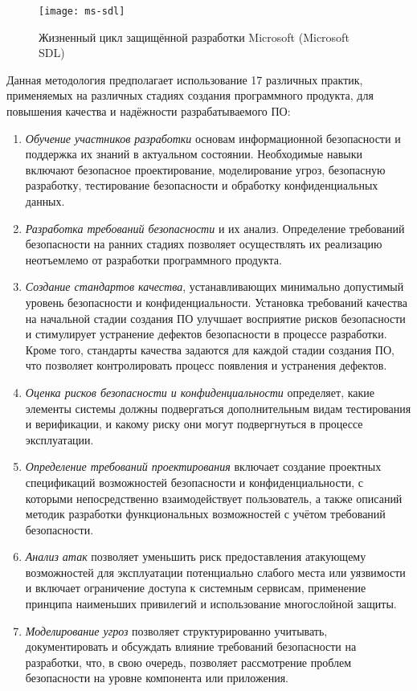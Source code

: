 \begin{figure}[h]
   \centering
   \texttt{[image: ms-sdl]}
   \caption{Жизненный цикл защищённой разработки Microsoft (Microsoft SDL)}\label{pic:ms-sdl}
\end{figure}

Данная методология предполагает использование 17 различных практик, применяемых на различных стадиях создания программного продукта, для повышения качества и надёжности разрабатываемого ПО:

\begin{enumerate}
 \item \textit{Обучение участников разработки} основам информационной безопасности и поддержка их знаний в актуальном состоянии. Необходимые навыки включают безопасное проектирование, моделирование угроз, безопасную разработку, тестирование безопасности и обработку конфиденциальных данных.
 \item \textit{Разработка требований безопасности} и их анализ. Определение требований безопасности на ранних стадиях позволяет осуществлять их реализацию неотъемлемо от разработки программного продукта.
 \item \textit{Создание стандартов качества}, устанавливающих минимально допустимый уровень безопасности и конфиденциальности. Установка требований качества на начальной стадии создания ПО улучшает восприятие рисков безопасности и стимулирует устранение дефектов безопасности в процессе разработки. Кроме того, стандарты качества задаются для каждой стадии создания ПО, что позволяет контролировать процесс появления и устранения дефектов.
 \item \textit{Оценка рисков безопасности и конфиденциальности} определяет, какие элементы системы должны подвергаться дополнительным видам тестирования и верификации, и какому риску они могут подвергнуться в процессе эксплуатации.
 \item \textit{Определение требований проектирования} включает создание проектных спецификаций возможностей безопасности и конфиденциальности, с которыми непосредственно взаимодействует пользователь, а также описаний методик разработки функциональных возможностей с учётом требований безопасности.
 \item \textit{Анализ атак} позволяет уменьшить риск предоставления атакующему возможностей для эксплуатации потенциально слабого места или уязвимости и включает ограничение доступа к системным сервисам, применение принципа наименьших привилегий и использование многослойной защиты.
 \item \textit{Моделирование угроз} позволяет структурированно учитывать, документировать и обсуждать влияние требований безопасности на разработки, что, в свою очередь, позволяет рассмотрение проблем безопасности на уровне компонента или приложения.

\end{enumerate}

